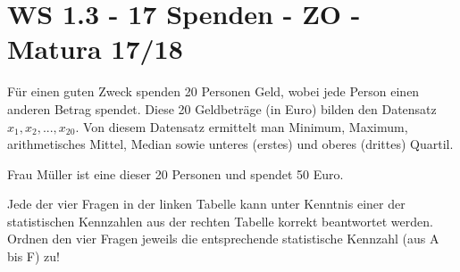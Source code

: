 \section{WS 1.3 - 17 Spenden - ZO - Matura 17/18}

\begin{beispiel}[WS 1.3]{1} %
Für einen guten Zweck spenden 20 Personen Geld, wobei jede Person einen anderen Betrag spendet. Diese 20 Geldbeträge (in Euro) bilden den Datensatz $x_1, x_2,...,x_{20}$. Von diesem Datensatz ermittelt man Minimum, Maximum, arithmetisches Mittel, Median sowie unteres (erstes) und oberes (drittes) Quartil.

Frau Müller ist eine dieser 20 Personen und spendet 50 Euro.

Jede der vier Fragen in der linken Tabelle kann unter Kenntnis einer der statistischen Kennzahlen aus der rechten Tabelle korrekt beantwortet werden.
Ordnen den vier Fragen jeweils die entsprechende statistische Kennzahl (aus A bis F) zu!

\end{beispiel}